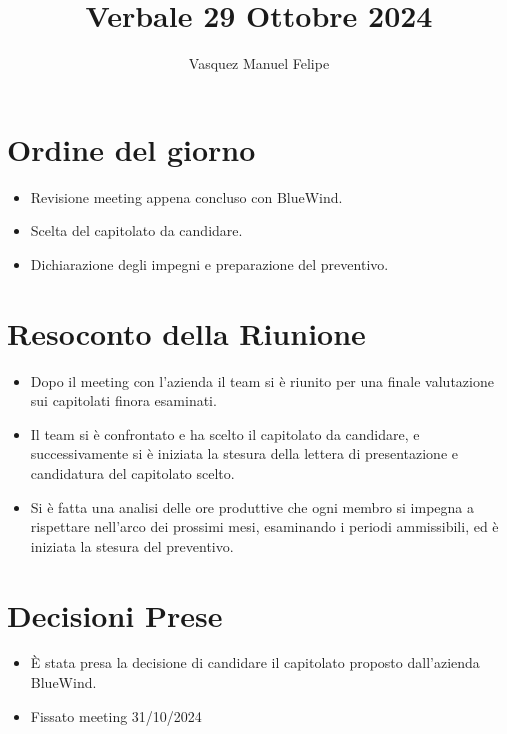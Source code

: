 \documentclass{TWReport}
\title{Verbale 29 Ottobre 2024}
\author{Vasquez Manuel Felipe}
\begin{document}
	
	\frontmatter
	
	\showPartecipants
	
	\section*{Ordine del giorno}

	\begin{itemize}
		\item Revisione meeting appena concluso con BlueWind.
		\item Scelta del capitolato da candidare.
		\item Dichiarazione degli impegni e preparazione del preventivo.
		
	\end{itemize}
	
	\section*{Resoconto della Riunione}
	\begin{itemize}

		\item Dopo il meeting con l'azienda il team si è riunito per una finale valutazione sui capitolati finora esaminati.
	
		\item Il team si è confrontato e ha scelto il capitolato da candidare, e successivamente si è iniziata la stesura della lettera di presentazione e candidatura del capitolato scelto. 
	
		\item Si è fatta una analisi delle ore produttive che ogni membro si impegna a rispettare nell'arco dei prossimi mesi, esaminando i periodi ammissibili, ed è iniziata la stesura del preventivo. 
		
		
	\end{itemize}
	
	\section*{Decisioni Prese}
	\begin{itemize}
		\item È stata presa la decisione di candidare il capitolato proposto dall'azienda BlueWind.
		\item Fissato meeting 31/10/2024
		
	\end{itemize}
	
\end{document}
